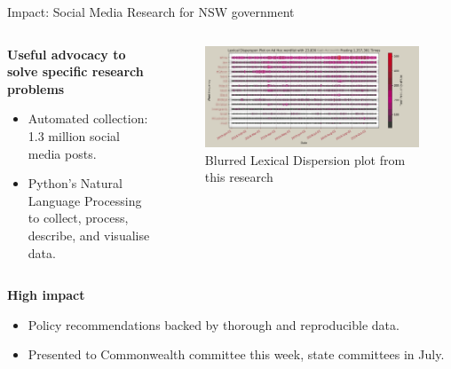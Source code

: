 \documentclass[aspectratio=169, 11pt]{beamer} %
\begin{document}
\begin{frame}{Impact: Social Media Research for NSW government}
\begin{columns}[t]
\begin{column}{.35\textwidth}
\textbf{Useful advocacy to solve specific research problems}
\begin{itemize}
    \item Automated collection: 1.3 million social media posts.
    \item Python's Natural Language Processing to collect, process, describe, and visualise data.
\end{itemize}

\end{column}
\begin{column}{.55\textwidth}
\begin{figure}
    \vspace{-.5cm}
    \centering
    \includegraphics[width=\textwidth]{figures/blur.png}
    \caption{Blurred Lexical Dispersion plot from this research}
\end{figure}
\end{column}
\end{columns}
\textbf{High impact}
\begin{itemize}
    \item Policy recommendations backed by thorough and reproducible data. 
    \item Presented to Commonwealth committee this week, state committees in July.

    
\end{itemize}
\end{frame}
\end{document}
